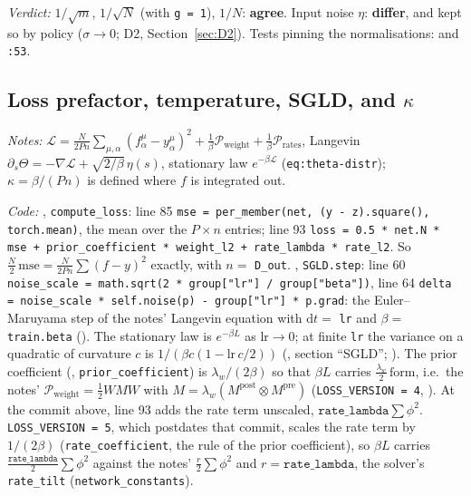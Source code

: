\documentclass[11pt,a4paper]{article}
\newcommand{\code}[1]{\texttt{#1}}
\newcommand{\agree}{\textbf{agree}}
\newcommand{\differ}{\textbf{differ}}
\begin{document}
\emph{Verdict:} $1/\sqrt m$, $1/\sqrt N$ (with \code{g = 1}), $1/N$: \agree. Input noise $\eta$: \differ{}, and kept so by policy ($\sigma\to0$; D2, Section~\ref{sec:D2}). Tests pinning the normalisations:  and \code{:53}.

\subsection{Loss prefactor, temperature, SGLD, and \texorpdfstring{$\kappa$}{kappa}}
\label{sec:loss}
\emph{Notes:} $\mathcal L = \frac N{2Pn}\sum_{\mu,\alpha}(f^\mu_\alpha - y^\mu_\alpha)^2 + \frac1\beta\mathcal P_{\mathrm{weight}} + \frac1\beta\mathcal P_{\mathrm{rates}}$, Langevin $\partial_s\Theta = -\nabla\mathcal L + \sqrt{2/\beta}\,\eta(s)$, stationary law $e^{-\beta\mathcal L}$ (\code{eq:theta-distr}); $\kappa = \beta/(Pn)$ is defined where $f$ is integrated out.

\emph{Code:} , \code{compute\_loss}: line 85 \code{mse = per\_member(net, (y - z).square(), torch.mean)}, the mean over the $P\times n$ entries; line 93 \code{loss = 0.5 * net.N * mse + prior\_coefficient * weight\_l2 + rate\_lambda * rate\_l2}. So $\frac N2\,\mathrm{mse} = \frac N{2Pn}\sum(f-y)^2$ exactly, with $n = $ \code{D\_out}. , \code{SGLD.step}: line 60 \code{noise\_scale = math.sqrt(2 * group["lr"] / group["beta"])}, line 64 \code{delta = noise\_scale * self.noise(p) - group["lr"] * p.grad}: the Euler--Maruyama step of the notes' Langevin equation with $\mathrm dt = $ \code{lr} and $\beta = $ \code{train.beta} (). The stationary law is $e^{-\beta L}$ as $\mathrm{lr}\to0$; at finite \code{lr} the variance on a quadratic of curvature $c$ is $1/(\beta c(1 - \mathrm{lr}\,c/2))$ (, section ``SGLD''; ). The prior coefficient (, \code{prior\_coefficient}) is $\lambda_w/(2\beta)$ so that $\beta L$ carries $\frac{\lambda_w}2\,\mathrm{form}$, i.e.\ the notes' $\mathcal P_{\mathrm{weight}} = \frac12 W M W$ with $M = \lambda_w(M^{\mathrm{post}}\otimes M^{\mathrm{pre}})$ (\code{LOSS\_VERSION = 4}, ). At the commit above, line 93 adds the rate term unscaled, $\code{rate\_lambda}\sum\phi^2$. \code{LOSS\_VERSION = 5}, which postdates that commit, scales the rate term by $1/(2\beta)$ (\code{rate\_coefficient}, the rule of the prior coefficient), so $\beta L$ carries $\frac{\code{rate\_lambda}}2\sum\phi^2$ against the notes' $\frac r2\sum\phi^2$ and $r = \code{rate\_lambda}$, the solver's \code{rate\_tilt} (\code{network\_constants}).
\end{document}
